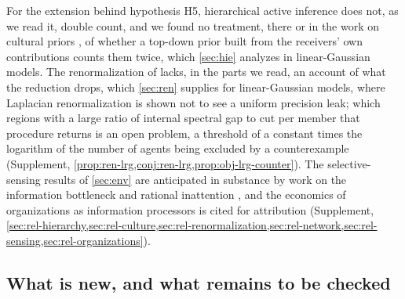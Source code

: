 For the extension behind hypothesis H5, hierarchical active inference \citep{friston2008hierarchical,friston2017graphical} does not, as we read it, double count, and we found no treatment, there or in the work on cultural priors \citep{veissiere2020thinking,constant2019regimes}, of whether a top-down prior built from the receivers' own contributions counts them twice, which \cref{sec:hie} analyzes in linear-Gaussian models. The renormalization of \citet{friston2019free} lacks, in the parts we read, an account of what the reduction drops, which \cref{sec:ren} supplies for linear-Gaussian models, where Laplacian renormalization \citep{villegas2023laplacian} is shown not to see a uniform precision leak; which regions with a large ratio of internal spectral gap to cut per member that procedure returns is an open problem, a threshold of a constant times the logarithm of the number of agents being excluded by a counterexample (Supplement, \cref{prop:ren-lrg,conj:ren-lrg,prop:obj-lrg-counter}). The selective-sensing results of \cref{sec:env} are anticipated in substance by work on the information bottleneck and rational inattention \citep{chechik2005information,sims2003implications}, and the economics of organizations as information processors \citep{radner1962team,marschak1972economic} is cited for attribution (Supplement, \cref{sec:rel-hierarchy,sec:rel-culture,sec:rel-renormalization,sec:rel-network,sec:rel-sensing,sec:rel-organizations}).

\subsection{What is new, and what remains to be checked}\label{sec:rel-new}

